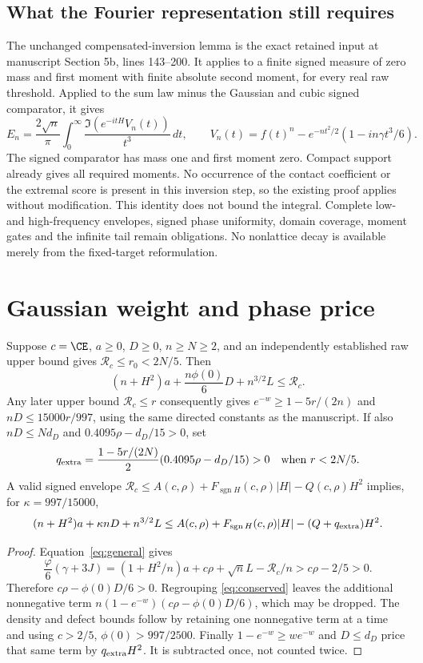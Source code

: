 \subsection{What the Fourier representation still requires}
The unchanged compensated-inversion lemma is the exact retained input
at manuscript Section 5b, lines 143--200. It applies to a finite signed
measure of zero mass and first moment with finite absolute second moment,
for every real raw threshold. Applied to the sum law minus the Gaussian
and cubic signed comparator, it gives
\[
 E_n=\frac{2\sqrt n}{\pi}\int_0^\infty
     \frac{\Im(e^{-itH}V_n(t))}{t^3}\,dt,
 \qquad V_n(t)=f(t)^n-e^{-nt^2/2}(1-in\gamma t^3/6).
\]
The signed comparator has mass one and first moment zero. Compact support
already gives all required moments. No occurrence of the contact
coefficient or the extremal score is present in this inversion step, so
the existing proof applies without modification.
This identity does not bound the integral. Complete low- and
high-frequency envelopes, signed phase uniformity, domain coverage,
moment gates and the infinite tail remain obligations. No nonlattice
decay is available merely from the fixed-target reformulation.

\section{Gaussian weight and phase price}
\begin{corollary}\label{cor:weight}
Suppose $c=\CE$, $a\ge0$, $D\ge0$, $n\ge N\ge2$, and an independently
established raw upper bound gives $\mathscr R_c\le r_0<2N/5$. Then
\[
 (n+H^2)a+\frac{n\phi(0)}6D+n^{3/2}L\le\mathscr R_c.
\]
Any later upper bound $\mathscr R_c\le r$ consequently gives
$e^{-w}\ge1-5r/(2n)$ and $nD\le15000r/997$, using the same directed
constants as the manuscript. If also $nD\le Nd_D$ and
$0.4095\rho-d_D/15>0$, set
\[
 q_{\rm extra}=\frac{1-5r/(2N)}2(0.4095\rho-d_D/15)>0
 \quad\text{when } r<2N/5.
\]
A valid signed envelope
$\mathscr R_c\le A(c,\rho)+F_{\operatorname{sgn}H}(c,\rho)|H|
-Q(c,\rho)H^2$ implies, for $\kappa=997/15000$,
\[
 (n+H^2)a+\kappa nD+n^{3/2}L
 \le A(c,\rho)+F_{\operatorname{sgn}H}(c,\rho)|H|
                       -(Q+q_{\rm extra})H^2.
\]
\end{corollary}
\begin{proof}
Equation~\eqref{eq:general} gives
\[
 \frac{\varphi}{6}(\gamma+3J)
 =(1+H^2/n)a+c\rho+\sqrt nL-\mathscr R_c/n
 >c\rho-2/5>0.
\]
Therefore $c\rho-\phi(0)D/6>0$. Regrouping
\eqref{eq:conserved} leaves the additional nonnegative term
$n(1-e^{-w})(c\rho-\phi(0)D/6)$, which may be dropped. The density and
defect bounds follow by retaining one nonnegative term at a time and
using $c>2/5$, $\phi(0)>997/2500$. Finally
$1-e^{-w}\ge we^{-w}$ and $D\le d_D$ price that same term by
$q_{\rm extra}H^2$. It is subtracted once, not counted twice.
\end{proof}

